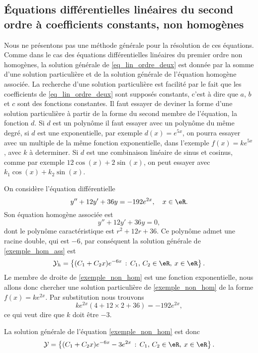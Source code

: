 \subsection{Équations différentielles linéaires du second ordre à coefficients constants, non homogènes}

Nous ne présentons pas une méthode générale pour la résolution de ces équations. Comme dans le cas des équations différentielles linéaires du premier ordre non homogènes, la solution générale de \eqref{eq_lin_ordre_deux} est donnée par la somme d'une solution particulière et de la solution générale de l'équation homogène associée. La recherche d'une solution particulière est facilité par le fait que les coefficients de \eqref{eq_lin_ordre_deux} sont supposés constants, c'est à dire que $a$, $b$ et $c$ sont des fonctions constantes. Il faut essayer de deviner la forme d'une solution particulière à partir de la forme du second membre de l'équation, la fonction $d$. Si $d$ est un polynôme il faut essayer avec un polynôme du même degré, si $d$ est une exponentielle, par exemple $d(x) = e^{5x}$, on pourra essayer avec un multiple de la m\^eme fonction exponentielle, dans l'exemple $f(x) = k e^{5x}$, avec $k$ à determiner. Si $d$ est une combinaison linéaire de sinus et cosinus, comme par exemple $12\cos(x) + 2\sin(x)$, on peut essayer avec $k_1\cos(x) + k_2\sin(x)$.

\begin{example}
  On considère l'équation différentielle
  \begin{equation}\label{exemple_non_hom}
    y'' + 12y' + 36 y = -192 e^{2x}, \quad x\in\eR.
  \end{equation}
  Son équation homogène associée est
\begin{equation}\label{exemple_hom_ass}
    y'' + 12y' + 36 y = 0,
  \end{equation}
dont le polynôme caractéristique est $r^2 + 12 r + 36$. Ce polynôme admet une racine double, qui est $-6$, par conséquent la solution générale de \eqref{exemple_hom_ass} est
\begin{equation*}
      \mathcal{Y}_h  = \left\{(C_1  +C_2x) e^{-6 x} \,:\, C_1,\, C_2 \in \eR, \: x\in \eR\right\}.
    \end{equation*}
Le membre de droite de \eqref{exemple_non_hom} est une fonction exponentielle, nous allons donc chercher une solution particulière de \eqref{exemple_non_hom} de la forme $f(x) = ke^{2x}$. Par substitution nous trouvons
\[
  ke^{2x}(4 + 12 \times 2 +36) = -192 e^{2x},
\]
ce qui veut dire que $k$ doit \^etre $-3$.

La solution générale de l'équation \eqref{exemple_non_hom} est donc
\begin{equation*}
      \mathcal{Y}  = \left\{(C_1  +C_2x) e^{-6 x} -3e^{2x} \,:\, C_1,\, C_2 \in \eR, \: x\in \eR\right\}.
    \end{equation*}
\end{example}

